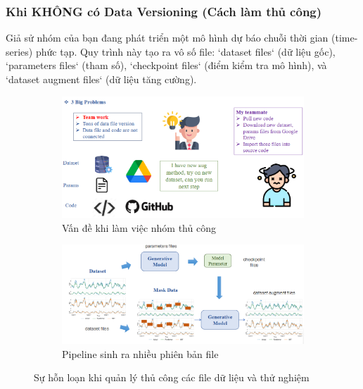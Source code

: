 \documentclass[11pt]{article}
\begin{document}
\subsubsection{Khi KHÔNG có Data Versioning (Cách làm thủ công)}
Giả sử nhóm của bạn đang phát triển một mô hình dự báo chuỗi thời gian (time-series) phức tạp. Quy trình này tạo ra vô số file: `dataset files` (dữ liệu gốc), `parameters files` (tham số), `checkpoint files` (điểm kiểm tra mô hình), và `dataset augment files` (dữ liệu tăng cường).

\begin{figure}[H]
    \centering
    \begin{subfigure}{0.48\textwidth}
        \includegraphics[width=\linewidth]{images/3problems.png}
        \caption{Vấn đề khi làm việc nhóm thủ công}
    \end{subfigure}
    \hfill
    \begin{subfigure}{0.48\textwidth}
        \includegraphics[width=\linewidth]{images/timeseries.png}
        \caption{Pipeline sinh ra nhiều phiên bản file}
    \end{subfigure}
    \caption{Sự hỗn loạn khi quản lý thủ công các file dữ liệu và thử nghiệm}
\end{figure}
\end{document}
